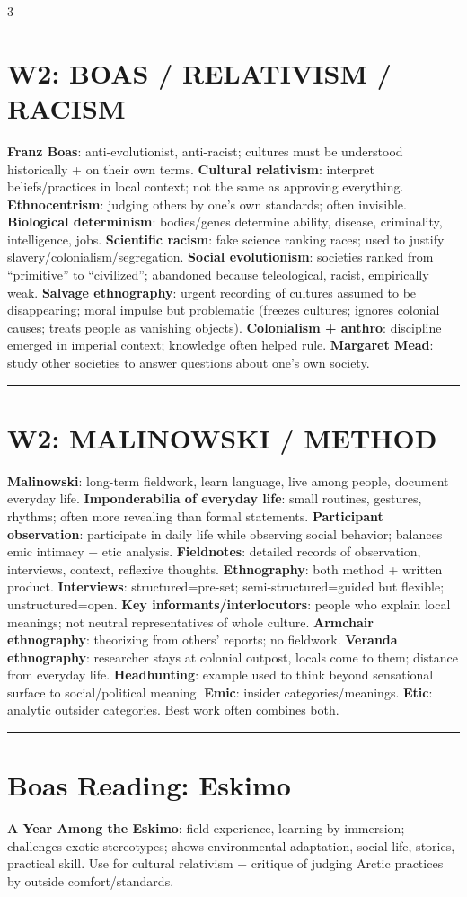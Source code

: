 \documentclass[10pt,landscape]{article}
\newcommand{\kw}[1]{\textbf{#1}}
\newcommand{\sep}{\vspace{0.8pt}\hrule\vspace{0.8pt}}
\begin{document}
\begin{multicols}{3}
\section*{W2: BOAS / RELATIVISM / RACISM}
\kw{Franz Boas}: anti-evolutionist, anti-racist; cultures must be understood historically + on their own terms. \kw{Cultural relativism}: interpret beliefs/practices in local context; not the same as approving everything. \kw{Ethnocentrism}: judging others by one's own standards; often invisible. \kw{Biological determinism}: bodies/genes determine ability, disease, criminality, intelligence, jobs. \kw{Scientific racism}: fake science ranking races; used to justify slavery/colonialism/segregation. \kw{Social evolutionism}: societies ranked from ``primitive'' to ``civilized''; abandoned because teleological, racist, empirically weak. \kw{Salvage ethnography}: urgent recording of cultures assumed to be disappearing; moral impulse but problematic (freezes cultures; ignores colonial causes; treats people as vanishing objects). \kw{Colonialism + anthro}: discipline emerged in imperial context; knowledge often helped rule. \kw{Margaret Mead}: study other societies to answer questions about one's own society.
\sep
\section*{W2: MALINOWSKI / METHOD}
\kw{Malinowski}: long-term fieldwork, learn language, live among people, document everyday life. \kw{Imponderabilia of everyday life}: small routines, gestures, rhythms; often more revealing than formal statements. \kw{Participant observation}: participate in daily life while observing social behavior; balances emic intimacy + etic analysis. \kw{Fieldnotes}: detailed records of observation, interviews, context, reflexive thoughts. \kw{Ethnography}: both method + written product. \kw{Interviews}: structured=pre-set; semi-structured=guided but flexible; unstructured=open. \kw{Key informants/interlocutors}: people who explain local meanings; not neutral representatives of whole culture. \kw{Armchair ethnography}: theorizing from others' reports; no fieldwork. \kw{Veranda ethnography}: researcher stays at colonial outpost, locals come to them; distance from everyday life. \kw{Headhunting}: example used to think beyond sensational surface to social/political meaning. \kw{Emic}: insider categories/meanings. \kw{Etic}: analytic outsider categories. Best work often combines both.
\sep
\section*{Boas Reading: Eskimo}
\kw{A Year Among the Eskimo}: field experience, learning by immersion; challenges exotic stereotypes; shows environmental adaptation, social life, stories, practical skill. Use for cultural relativism + critique of judging Arctic practices by outside comfort/standards.


\end{multicols}
\end{document}

